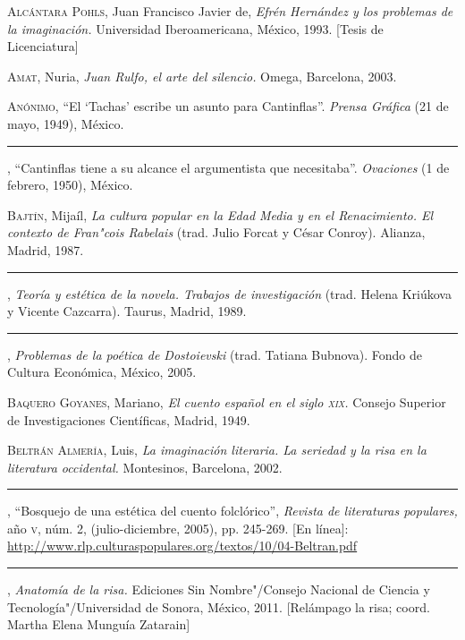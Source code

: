 \documentclass[14pt,twoside,final]{extbook} %
\begin{document}
\textsc{Alcántara Pohls}, Juan Francisco Javier de, \emph{Efrén Hernández y los problemas de la imaginación.} Universidad Iberoamericana, México, 1993. [Tesis de Licenciatura]\label{bib:alcantara1993}

\textsc{Amat}, Nuria, \emph{Juan Rulfo, el arte del silencio.} Omega, Barcelona, 2003.\label{bib:amat2003}

\textsc{Anónimo}, ``El `Tachas' escribe un asunto para Cantinflas''. \emph{Prensa Gráfica} (21 de mayo, 1949), México.\label{bib:anonimo1949}

\rule{1cm}{0.4pt}, ``Cantinflas tiene a su alcance el argumentista que necesitaba''. \emph{Ovaciones} (1 de febrero, 1950), México.\label{bib:anonimo1950}

\textsc{Bajtín}, Mijaíl, \emph{La cultura popular en la Edad Media y en el Renacimiento. El contexto de Fran"cois Rabelais} (trad. Julio Forcat y César Conroy). Alianza, Madrid, 1987.\label{bib:bajtin1987}

\rule{1cm}{0.4pt}, \emph{Teoría y estética de la novela. Trabajos de investigación} (trad. Helena Kriúkova y Vicente Cazcarra). Taurus, Madrid, 1989.\label{bib:bajtin1989}

\rule{1cm}{0.4pt}, \emph{Problemas de la poética de Dostoievski} (trad. Tatiana Bubnova). Fondo de Cultura Económica, México, 2005.\label{bib:bajtin2005}

\textsc{Baquero Goyanes}, Mariano, \emph{El cuento español en el siglo \textsc{xix}.} Consejo Superior de Investigaciones Científicas, Madrid, 1949.\label{bib:baquero1949}

\textsc{Beltrán Almería}, Luis, \emph{La imaginación literaria. La seriedad y la risa en la literatura occidental.} Montesinos, Barcelona, 2002.\label{bib:beltran2002}

\rule{1cm}{0.4pt}, ``Bosquejo de una estética del cuento folclórico'', \emph{Revista de literaturas populares,} año \textsc{v}, núm. 2, (julio-diciembre, 2005), pp. 245-269. [En línea]: \url{http://www.rlp.culturaspopulares.org/textos/10/04-Beltran.pdf}\label{bib:beltran2005}

\rule{1cm}{0.4pt}, \emph{Anatomía de la risa.} Ediciones Sin Nombre"/Consejo Nacional de Ciencia y Tecnología"/Universidad de Sonora, México, 2011. [Relámpago la risa; coord. Martha Elena Munguía Zatarain]\label{bib:beltran2011}
\end{document}
